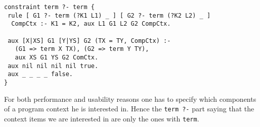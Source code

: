 \documentclass[preprint]{sigplanconf}
\begin{document}
{\small
\begin{verbatim}
constraint term ?- term {
 rule [ G1 ?- term (?K1 L1) _ ] [ G2 ?- term (?K2 L2) _ ]
  CompCtx :- K1 = K2, aux L1 G1 L2 G2 CompCtx.

 aux [X|XS] G1 [Y|YS] G2 (TX = TY, CompCtx) :-
   (G1 => term X TX), (G2 => term Y TY),
   aux XS G1 YS G2 ComCtx.
 aux nil nil nil nil true.
 aux _ _ _ _ false.   
}
\end{verbatim}
}

For both performance and usability reasons one has to specify
which components of a program context he is interested in.  Hence the
\verb+term ?-+ part saying that the context items we are interested in
are only the ones with \verb+term+.

% 
% 
\end{document}
